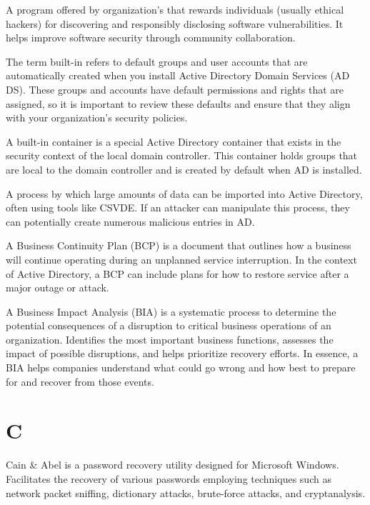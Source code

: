  A program offered by organization's that rewards individuals (usually ethical hackers) for discovering and responsibly disclosing software vulnerabilities. It helps improve software security through community collaboration.

 The term built-in refers to default groups and user accounts that are automatically created when you install Active Directory Domain Services (AD DS). These groups and accounts have default permissions and rights that are assigned, so it is important to review these defaults and ensure that they align with your organization’s security policies.

 A built-in container is a special Active Directory container that exists in the security context of the local domain controller. This container holds groups that are local to the domain controller and is created by default when AD is installed.

 A process by which large amounts of data can be imported into Active Directory, often using tools like CSVDE. If an attacker can manipulate this process, they can potentially create numerous malicious entries in AD.

 A Business Continuity Plan (BCP) is a document that outlines how a business will continue operating during an unplanned service interruption. In the context of Active Directory, a BCP can include plans for how to restore service after a major outage or attack.

 A Business Impact Analysis (BIA) is a systematic process to determine the potential consequences of a disruption to critical business operations of an organization. Identifies the most important business functions, assesses the impact of possible disruptions, and helps prioritize recovery efforts. In essence, a BIA helps companies understand what could go wrong and how best to prepare for and recover from those events. 

\section*{C}
 Cain \& Abel is a password recovery utility designed for Microsoft Windows. Facilitates the recovery of various passwords employing techniques such as network packet sniffing, dictionary attacks, brute-force attacks, and cryptanalysis.

